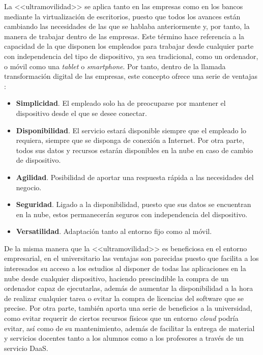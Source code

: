 \clearpage

La <<ultramovilidad>> se aplica tanto en las empresas como en los bancos \cite{antena3noticias2019} mediante la virtualización de escritorios, puesto que todos los avances están cambiando las necesidades de las que se hablaba anteriormente y, por tanto, la manera de trabajar dentro de las empresas. Este término hace referencia a la capacidad de la que disponen los empleados para trabajar desde cualquier parte con independencia del tipo de dispositivo, ya sea tradicional, como un ordenador, o móvil como una \textit{tablet} o \textit{smartphone}. Por tanto, dentro de la llamada transformación digital de las empresas, este concepto ofrece una serie de ventajas \cite{tecnologiaparatuempresa2019}:

\begin{itemize}
    \item \textbf{Simplicidad}. El empleado solo ha de preocuparse por mantener el dispositivo desde el que se desee conectar.
    \item \textbf{Disponibilidad}. El servicio estará disponible siempre que el empleado lo requiera, siempre que se disponga de conexión a Internet. Por otra parte, todos sus datos y recursos estarán disponibles en la nube en caso de cambio de dispositivo.
    \item \textbf{Agilidad}. Posibilidad de aportar una respuesta rápida a las necesidades del negocio.
    \item \textbf{Seguridad}. Ligado a la disponibilidad, puesto que sus datos se encuentran en la nube, estos permanecerán seguros con independencia del dispositivo.
    \item \textbf{Versatilidad}. Adaptación tanto al entorno fijo como al móvil.
\end{itemize}

De la misma manera que la <<ultramovilidad>> es beneficiosa en el entorno empresarial, en el universitario las ventajas son parecidas puesto que facilita a los interesados su acceso a los estudios al disponer de todas las aplicaciones en la nube desde cualquier dispositivo, haciendo prescindible la compra de un ordenador capaz de ejecutarlas, además de aumentar la disponibilidad a la hora de realizar cualquier tarea o evitar la compra de licencias del software que se precise. Por otra parte, también aporta una serie de beneficios a la universidad, como evitar requerir de ciertos recursos físicos que un entorno \textit{cloud} podría evitar, así como de su mantenimiento, además de facilitar la entrega de material y servicios docentes tanto a los alumnos como a los profesores a través de un servicio \acs{DaaS}.

